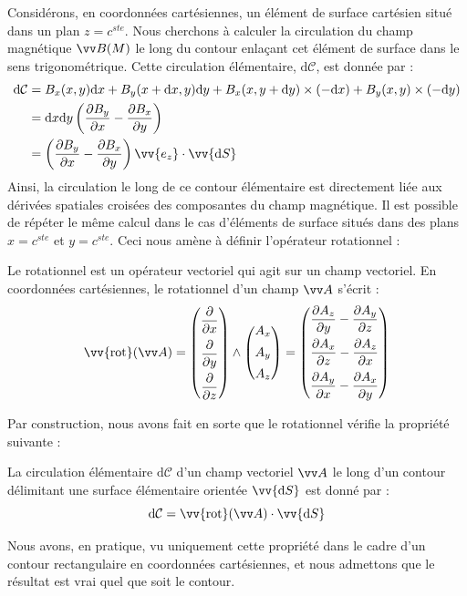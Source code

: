 \documentclass[11pt,fleqn]{book} %
\newcommand{\dd}{\mathrm{d}}
\newcommand{\rot}{\vv{\mathrm{rot}}}
\begin{document}
Considérons, en coordonnées cartésiennes, un élément de surface cartésien situé dans un plan $z = c^{ste}$. Nous cherchons à calculer la circulation du champ magnétique $\vv B(M)$ le long du contour enlaçant cet élément de surface dans le sens trigonométrique. Cette circulation élémentaire, $\dd \mathcal{C}$, est donnée par :
\begin{align}
	\dd \mathcal{C} &= B_x(x,y) \dd x + B_y(x+\dd x,y) \dd y + B_x(x,y+\dd y)\times (- \dd x) + B_y(x,y) \times (- \dd y) \\
	&= \dd x \dd y \left( \frac{\partial B_y}{\partial x} - \frac{\partial B_x}{\partial y} \right) \\
	&= \left( \frac{\partial B_y}{\partial x} - \frac{\partial B_x}{\partial y} \right) \vv{e_z} \cdot \vv{\dd S}
\end{align}
Ainsi, la circulation le long de ce contour élémentaire est directement liée aux dérivées spatiales croisées des composantes du champ magnétique. Il est possible de répéter le même calcul dans le cas d'éléments de surface situés dans des plans $x = c^{ste}$ et $y=c^{ste}$. Ceci nous amène à définir l'opérateur rotationnel :
\begin{definition}
	Le rotationnel est un opérateur vectoriel qui agit sur un champ vectoriel. En coordonnées cartésiennes, le rotationnel d'un champ $\vv A$ s'écrit :
	\begin{equation}
		\rot (\vv A) = \begin{pmatrix} \dfrac{\partial}{\partial x} \\[9pt]  \dfrac{\partial}{\partial y} \\[9pt] \dfrac{\partial}{\partial z} \end{pmatrix} \wedge \begin{pmatrix} A_x \\[5pt] A_y \\[5pt] A_z \end{pmatrix} = \begin{pmatrix} \dfrac{\partial A_z}{\partial y} - \dfrac{\partial A_y}{\partial z} \\[9pt] \dfrac{\partial A_x}{\partial z} - \dfrac{\partial A_z}{\partial x} \\[9pt] \dfrac{\partial A_y}{\partial x} - \dfrac{\partial A_x}{\partial y} \end{pmatrix}
	\end{equation}
\end{definition}

Par construction, nous avons fait en sorte que le rotationnel vérifie la propriété suivante :
\begin{proposition}
	La circulation élémentaire $\dd \mathcal{C}$ d'un champ vectoriel $\vv A$ le long d'un contour délimitant une surface élémentaire orientée $\vv{\dd S}$ est donné par :
	\begin{equation}
		\dd \mathcal{C} = \rot(\vv A) \cdot \vv{\dd S}
	\end{equation}
\end{proposition}
Nous avons, en pratique, vu uniquement cette propriété dans le cadre d'un contour rectangulaire en coordonnées cartésiennes, et nous admettons que le résultat est vrai quel que soit le contour.
\end{document}
